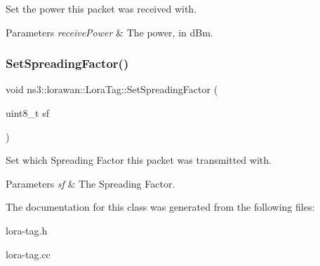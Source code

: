 Set the power this packet was received with.


\begin{DoxyParams}{Parameters}
{\em receive\+Power} & The power, in d\+Bm. \\
\hline
\end{DoxyParams}
\mbox{\label{classns3_1_1lorawan_1_1LoraTag_a7afef6f80d53d33748c4fd34a9df6e3e}} 
\subsubsection{\texorpdfstring{Set\+Spreading\+Factor()}{SetSpreadingFactor()}}
{\footnotesize\ttfamily void ns3\+::lorawan\+::\+Lora\+Tag\+::\+Set\+Spreading\+Factor (\begin{DoxyParamCaption}\item[{uint8\+\_\+t}]{sf }\end{DoxyParamCaption})}

Set which Spreading Factor this packet was transmitted with.


\begin{DoxyParams}{Parameters}
{\em sf} & The Spreading Factor. \\
\hline
\end{DoxyParams}


The documentation for this class was generated from the following files\+:\begin{DoxyCompactItemize}
\item 
lora-\/tag.\+h\item 
lora-\/tag.\+cc\end{DoxyCompactItemize}
